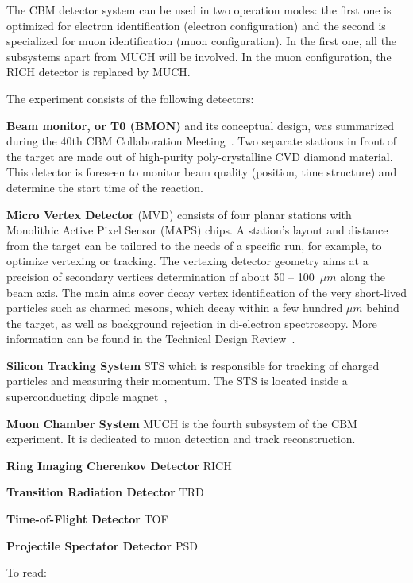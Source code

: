 The CBM detector system can be used in two operation modes: the first one is optimized for electron identification (electron configuration) and the second is specialized for muon identification (muon configuration). In the first one, all the subsystems apart from MUCH will be involved. In the muon configuration, the \gls{RICH} detector is replaced by \gls{MUCH}.



The experiment consists of the following detectors:

\textbf{Beam monitor, or T0 (\gls{BMON})} and its conceptual design, was summarized during the 40th \gls{CBM} Collaboration Meeting~\cite{bmon}. Two separate stations in front of the target are made out of high-purity poly-crystalline CVD diamond material. This detector is foreseen to monitor beam quality (position, time structure) and determine the start time of the reaction.

\textbf{Micro Vertex Detector} (\gls{MVD}) consists of four planar stations with Monolithic Active Pixel Sensor (\gls{MAPS}) chips. A station's layout and distance from the target can be tailored to the needs of a specific run, for example, to optimize vertexing or tracking. The vertexing detector geometry aims at a precision of secondary vertices determination of about 50 -- 100~$\mu m$ along the beam axis. The main aims cover decay vertex identification of the very short-lived particles such as charmed mesons, which decay within a few hundred $\mu m$ behind the target, as well as background rejection in di-electron spectroscopy. More information can be found in the Technical Design Review~\cite{MVD}.

 \textbf{Silicon Tracking System} \gls{STS} which is responsible for tracking of charged particles and measuring their momentum. The \gls{STS} is located inside a superconducting dipole magnet~\cite{Malakhov:109025},
 
\textbf{Muon Chamber System} \gls{MUCH} is the fourth subsystem of the \gls{CBM} experiment. It is dedicated to muon detection and track reconstruction.

\textbf{Ring Imaging Cherenkov Detector} \gls{RICH}

\textbf{Transition Radiation Detector} \gls{TRD}

\textbf{Time-of-Flight Detector} \gls{TOF}


\textbf{Projectile Spectator Detector} \gls{PSD}



To read:


